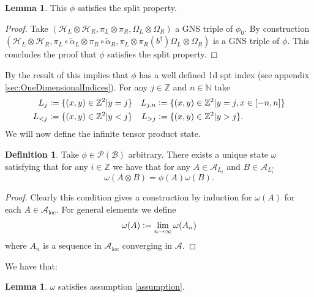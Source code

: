 \documentclass[12pt,a4paper,twoside]{article}
\newcommand{\defeq}{\vcentcolon=}
\newcommand{\BB}{\mathcal B}
\newcommand{\PP}{\mathcal P}
\newcommand{\HH}{\mathcal H}
\newcommand{\ZZ}{\mathbb Z}
\renewcommand{\AA}{\mathcal A}
\newcommand{\NN}{\mathbb{N}}
\theoremstyle{definition}
\newtheorem{definition}[theorem]{Definition}
\newtheorem{lemma}[theorem]{Lemma}
\numberwithin{equation}{section}
\begin{document}
\begin{lemma}
	This $\phi$ satisfies the split property.
\end{lemma}
\begin{proof}
	Take $(\HH_L\otimes\HH_R,\pi_L\otimes\pi_R,\Omega_L\otimes\Omega_R)$ a GNS triple of $\phi_0$. By construction $(\HH_L\otimes\HH_R,\pi_L\circ\tilde\alpha_L\otimes\pi_R\circ\tilde\alpha_R,\pi_L\otimes\pi_R(b^\dagger)\Omega_L\otimes\Omega_R)$ is a GNS triple of $\phi$. This concludes the proof that $\phi$ satisfies the split property.
\end{proof}
By the result of \cite{ogata2019classification} this implies that $\phi$ has a well defined 1d spt index (see appendix \ref{sec:OneDimensionalIndices}). For any $j\in\ZZ$ and $n\in\NN$ take
\begin{align}
	L_j&\defeq \{(x,y)\in\ZZ^2|y=j\}&L_{j,n}&\defeq \{(x,y)\in\ZZ^2|y=j,x\in[-n,n]\}\\
	L_{<j}&\defeq \{(x,y)\in\ZZ^2|y<j\}&L_{>j}&\defeq \{(x,y)\in\ZZ^2|y>j\}.
\end{align}
We will now define the infinite tensor product state.
\begin{definition}\label{def:InfiniteTensorProductState}
	Take $\phi\in\PP(\BB)$ arbitrary. There exists a unique state $\omega$ satisfying that for any $i\in\ZZ$ we have that for any $A\in\AA_{L_i}$ and $B\in\AA_{L_i^c}$
	\begin{equation}
		\omega(A\otimes B)=\phi(A)\omega(B).
	\end{equation}
\end{definition}
\begin{proof}
	Clearly this condition gives a construction by induction for $\omega(A)$ for each $A\in\AA_{\text{loc}}$. For general elements we define
	\begin{equation}
		\omega(A)\defeq \lim_{n\rightarrow\infty}\omega(A_n)
	\end{equation}
	where $A_n$ is a sequence in $\AA_{\text{loc}}$ converging in $\AA$.
\end{proof}
We have that:
\begin{lemma}
	$\omega$ satisfies assumption \ref{assumption}.
\end{lemma}
\end{document}
